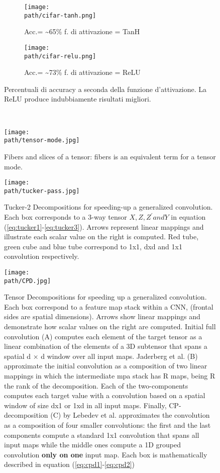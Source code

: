 \begin{figure}
\centering
\begin{subfigure}{.5\textwidth}
  \centering
 \texttt{[image: \\path/cifar-tanh.png]} 
  \caption{Acc.= \textasciitilde 65\% f. di attivazione = TanH}
 \label{fig:training}
\end{subfigure}%
\begin{subfigure}{.5\textwidth}
  \centering
 \texttt{[image: \\path/cifar-relu.png]} 
  \caption{Acc.= \textasciitilde 73\% f. di attivazione = ReLU}
 \label{fig:validation}
\end{subfigure}
\caption{Percentuali di accuracy a seconda della funzione d'attivazione. La ReLU produce indubbiamente risultati migliori.}
\label{fig:relu}
\end{figure}
\\
\newpage
\pagebreak
\medskip
\newpage

\begin{figure}[h!]
 \centering
 \texttt{[image: \\path/tensor-mode.jpg]} 
 \caption{Fibers and slices of a tensor: fibers is an equivalent term for a tensor mode.}
 \label{fig:tensor-fibers}
\end{figure}

\begin{figure}[h!]
 \centering
 \texttt{[image: \\path/tucker-pass.jpg]} 
 \caption{Tucker-2  Decompositions  for  speeding-up  a generalized convolution. Each box corresponds to a 3-way tensor $X, Z, Z^' and Y$ in equation (\ref{eq:tucker1}-\ref{eq:tucker3}). Arrows represent linear mappings 
and illustrate each scalar value on the right is computed. Red tube, green cube and blue tube correspond to 
1x1, dxd and 1x1 convolution respectively.}
 \label{fig:tucker-pass}
\end{figure}


\begin{figure}[h!]
 \centering
 \texttt{[image: \\path/CPD.jpg]} 
 \caption{Tensor Decompositions for speeding up a generalized convolution. Each box correspond to a feature map stack within a CNN, (frontal sides are spatial dimensions). Arrows show linear mappings and demonstrate how scalar values on the right are computed. Initial full convolution (A) computes each element of the target tensor as a linear combination of the elements of a 3D subtensor that spans a spatial d × d window over all input maps. 
Jaderberg et al. (B) approximate the initial convolution as a composition of two linear mappings in which the intermediate mpa stack has R  maps, being R the rank of the decomposition. Each of the two-components 
computes each target value with a convolution based on a spatial window of size dx1 or 1xd in all input maps. Finally, CP-decomposition (C) by Lebedev et al. approximates the convolution as a composition of four smaller convolutions: the first and the last components compute a standard 1x1 convolution that spans all input maps while the middle ones compute a 1D grouped convolution \textbf{only on one} input map. Each box is mathematically described in equation (\ref{eq:cpd1}-\ref{eq:cpd2})}
 \label{fig:cpd-pass}
\end{figure}


